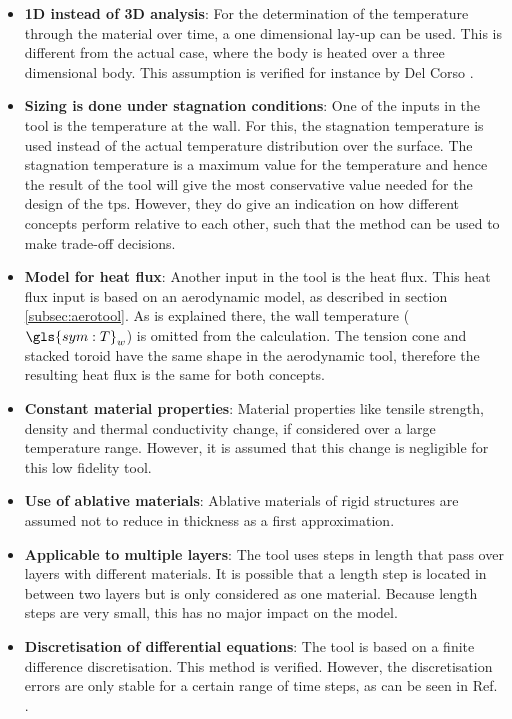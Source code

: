 \begin{itemize}
	\item \textbf{1D instead of 3D analysis}: For the determination of the temperature through the material over time, a one dimensional lay-up can be used. This is different from the actual case, where the body is heated over a three dimensional body. This assumption is verified for instance by Del Corso \cite{Corso2009}.
	\item \textbf{Sizing is done under stagnation conditions}: One of the inputs in the tool is the temperature at the wall. For this, the stagnation temperature is used instead of the actual temperature distribution over the surface. The stagnation temperature is a maximum value for the temperature and hence the result of the tool will give the most conservative value needed for the design of the \gls{tps}. However, they do give an indication on how different concepts perform relative to each other, such that the method can be used to make trade-off decisions.
	\item \textbf{Model for heat flux}: Another input in the tool is the heat flux. This heat flux input is based on an aerodynamic model, as described in section \ref{subsec:aerotool}. As is explained there, the wall temperature ($\gls{sym:T}_w$) is omitted from the calculation. The tension cone and stacked toroid have the same shape in the aerodynamic tool, therefore the resulting heat flux is the same for both concepts.
	\item \textbf{Constant material properties}: Material properties like tensile strength, density and thermal conductivity change, if considered over a large temperature range. However, it is assumed that this change is negligible for this low fidelity tool. 
	\item \textbf{Use of ablative materials}: Ablative materials of rigid structures are assumed not to reduce in thickness as a first approximation.
	\item \textbf{Applicable to multiple layers}: The tool uses steps in length that pass over layers with different materials. It is possible that a length step is located in between two layers but is only considered as one material. Because length steps are very small, this has no major impact on the model.
	\item \textbf{Discretisation of differential equations}: The tool is based on a finite difference discretisation. This method is verified. However, the discretisation errors are only stable for a certain range of time steps, as can be seen in Ref. \cite{Smith2011,Holman2002}. 
\end{itemize}

